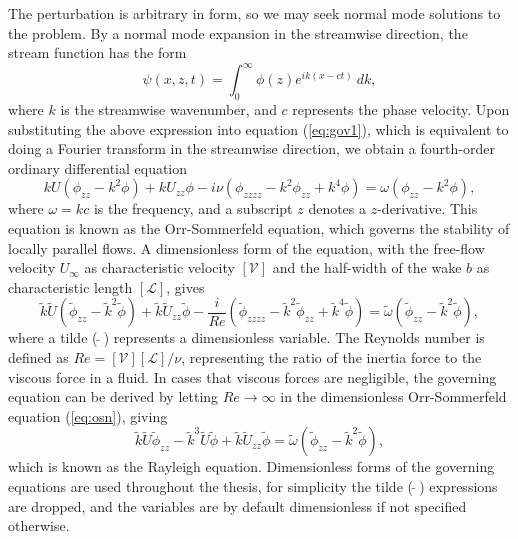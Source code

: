 The perturbation is arbitrary in form, so we may seek normal mode solutions to the problem. By a normal mode expansion in the streamwise direction, the stream function has the form
\begin{equation}
    \psi (x,z,t)=\int _{0}^{\infty } \phi (z)e^{ik(x-ct)} \ dk,
\end{equation}
where $k$ is the streamwise wavenumber, and $c$ represents the phase velocity. Upon substituting the above expression into equation (\ref{eq:gov1}), which is equivalent to doing a Fourier transform in the streamwise direction, we obtain a fourth-order ordinary differential equation
\begin{equation}
    kU\left( \phi_{zz}-k^{2} \phi \right) +kU_{zz}\phi  -i\nu \left( \phi_{zzzz}-k^{2} \phi_{zz}+k^{4} \phi \right) =\omega \left( \phi_{zz}-k^{2} \phi \right),
    \label{eq:os}
\end{equation}
where $\omega=kc$ is the frequency, and a subscript $z$ denotes a $z$-derivative. This equation is known as the Orr-Sommerfeld equation, which governs the stability of locally parallel flows. A dimensionless form of the equation, with the free-flow velocity $U_\infty$ as characteristic velocity $[\mathcal{V}]$ and the half-width of the wake $b$ as characteristic length $[\mathcal{L}]$, gives
\begin{equation}
\tilde{k}\tilde{U}\left(\tilde{\phi}_{zz}-\tilde{k}^{2}\tilde{\phi}\right) +\tilde{k} \tilde{U}_{zz}\tilde{\phi}-\frac{i}{Re}\left( \tilde{\phi}_{zzzz}-\tilde{k}^{2} \tilde{\phi}_{zz}+\tilde{k}^{4} \tilde{\phi} \right) =\tilde{\omega} \left( \tilde{\phi}_{zz}-\tilde{k}^{2} \tilde{\phi} \right),
    \label{eq:osn}
\end{equation}
where a tilde ($\ \tilde{}\ $) represents a dimensionless variable. The Reynolds number is defined as $Re=[\mathcal{V}][\mathcal{L}]/\nu$, representing the ratio of the inertia force to the viscous force in a fluid. In cases that viscous forces are negligible, the governing equation can be derived by letting $Re\rightarrow\infty$ in the dimensionless Orr-Sommerfeld equation (\ref{eq:osn}), giving
\begin{equation}
\tilde{k}\tilde{U}\tilde{\phi}_{zz}-\tilde{k}^{3} \tilde{U}\tilde{\phi} +\tilde{k} \tilde{U}_{zz}\tilde{\phi}=\tilde{\omega} \left( \tilde{\phi}_{zz}-\tilde{k}^{2} \tilde{\phi} \right),
    \label{eq:rn}
\end{equation}
which is known as the Rayleigh equation. Dimensionless forms of the governing equations are used throughout the thesis, for simplicity the tilde ($\ \tilde{}\ $) expressions are dropped, and the variables are by default dimensionless if not specified otherwise.

